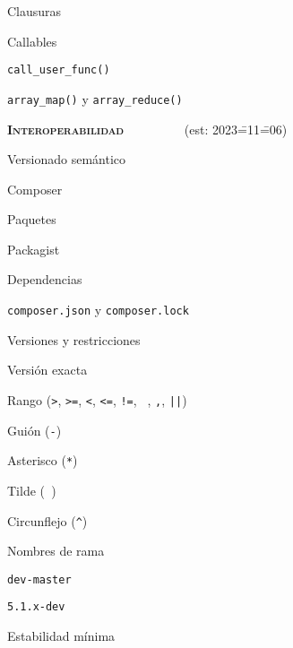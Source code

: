 \begin{longenum}
\begin{longenum}
\begin{longenum}
            \item Clausuras
        \end{longenum}
        \item Callables
        \begin{longenum}
            \item \texttt{call\_user\_func()}
            \item \texttt{array\_map()} y \texttt{array\_reduce()}
        \end{longenum}
    \end{longenum}
    \item \textbf{\textsc{Interoperabilidad}} \ \ \ \ \ \ \ \ \ (est: 2023\==11\==06)
    \begin{longenum}
        \item Versionado semántico
        \item Composer
        \begin{longenum}
            \item Paquetes
            \item Packagist
            \item Dependencias
            \begin{longenum}
                \item \texttt{composer.json} y \texttt{composer.lock}
            \end{longenum}
            \item Versiones y restricciones
            \begin{longenum}
                \item Versión exacta
                \item Rango (\texttt{>}, \texttt{>=}, \texttt{<}, \texttt{<=}, \texttt{!=}, \texttt{ }, \texttt{,}, \texttt{||})
                \item Guión (\texttt{-})
                \item Asterisco (\texttt{*})
                \item Tilde (\texttt{~})
                \item Circunflejo (\texttt{\^})
                \item Nombres de rama
                \begin{longenum}
                    \item \texttt{dev-master}
                    \item \texttt{5.1.x-dev}
                \end{longenum}
                \item Estabilidad mínima

\end{longenum}
\end{longenum}
\end{longenum}
\end{longenum}
